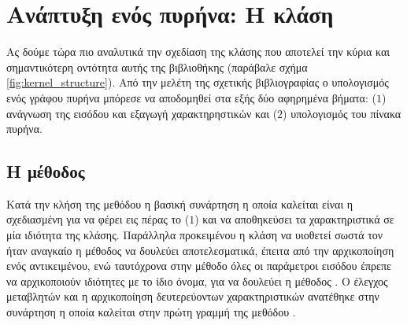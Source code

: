 \section{Ανάπτυξη ενός πυρήνα: Η κλάση }
Ας δούμε τώρα πιο αναλυτικά την σχεδίαση της κλάσης  που αποτελεί την κύρια και σημαντικότερη οντότητα αυτής της βιβλιοθήκης (παράβαλε σχήμα \ref{fig:kernel_structure}).
Από την μελέτη της σχετικής βιβλιογραφίας ο υπολογισμός ενός γράφου πυρήνα μπόρεσε να αποδομηθεί στα εξής δύο αφηρημένα βήματα:  ($1$) ανάγνωση της εισόδου και εξαγωγή χαρακτηρηστικών και ($2$) υπολογισμός του πίνακα πυρήνα.
\subsection{Η μέθοδος \texttt{}}
Κατά την κλήση της μεθόδου \texttt{} η βασική συνάρτηση η οποία καλείται είναι η \texttt{} σχεδιασμένη για να φέρει εις πέρας το ($1$) και να αποθηκεύσει τα χαρακτηριστικά σε μία ιδιότητα της κλάσης.
Παράλληλα προκειμένου η κλάση  να υιοθετεί σωστά τον  ήταν αναγκαίο η μέθοδος  να δουλεύει αποτελεσματικά, έπειτα από την αρχικοποίηση ενός αντικειμένου, ενώ ταυτόχρονα στην μέθοδο   όλες οι παράμετροι εισόδου έπρεπε να αρχικοποιούν ιδιότητες με το ίδιο όνομα, για να δουλεύει η μέθοδος .
Ο έλεγχος μεταβλητών και η αρχικοποίηση δευτερεύοντων χαρακτηριστικών ανατέθηκε στην συνάρτηση \texttt{} η οποία καλείται στην πρώτη γραμμή της μεθόδου \texttt{}.

